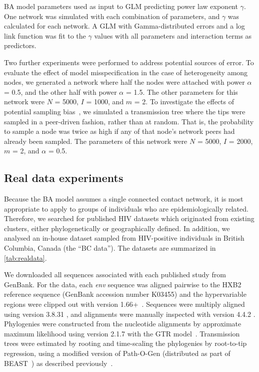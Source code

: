\begin{table}
  \centering
  
  \caption[\gls{BA} parameters used as input \gls{GLM} predicting $\gamma$]
  {
    \gls{BA} model parameters used as input to \gls{GLM} predicting power law
    exponent $\gamma$. One network was simulated with each combination of
    parameters, and $\gamma$ was calculated for each network. A \gls{GLM} with
    Gamma-distributed errors and a log link function was fit to the $\gamma$
    values with all parameters and interaction terms as predictors.
  }
  \label{tab:gammaexpt}
\end{table}

Two further experiments were performed to address potential sources of error.
To evaluate the effect of model misspecification in the case of heterogeneity
among nodes, we generated a network where half the nodes were attached with
power $\alpha$ = 0.5, and the other half with power $\alpha$ = 1.5. The other
parameters for this network were $N$ = 5000, $I$ = 1000, and $m$ = 2. To
investigate the effects of potential sampling
bias~\autocite{karcher2016quantifying}, we simulated a transmission tree where
the tips were sampled in a peer-driven fashion, rather than at random. That is,
the probability to sample a node was twice as high if any of that node's
network peers had already been sampled. The parameters of this network were $N$
= 5000, $I$ = 2000, $m$ = 2, and $\alpha$ = 0.5.

\subsection{Real data experiments}

Because the \gls{BA} model assumes a single connected contact network, it is
most appropriate to apply to groups of individuals who are epidemiologically
related. Therefore, we searched for published \gls{HIV} datasets which
originated from existing clusters, either phylogenetically or geographically
defined. In addition, we analysed an in-house dataset sampled from
\gls{HIV}-positive individuals in British Columbia, Canada (the ``BC data'').
The datasets are summarized in \cref{tab:realdata}.

We downloaded all sequences associated with each published study from GenBank.
For the \textcite{novitsky2014impact} data, each \textit{env} sequence was
aligned pairwise to the HXB2 reference sequence (GenBank accession number
K03455) and the hypervariable regions were clipped out with
 version 1.66+~\autocite{cock2009biopython}. Sequences were
multiply aligned using  version 3.8.31
\autocite{edgar2004muscle}, and alignments were manually inspected with
 version 4.4.2 \autocite{gouy2010seaview}. Phylogenies were
constructed from the nucleotide alignments by approximate maximum likelihood
using  version 2.1.7 \autocite{price2010fasttree} with the
\gls{GTR} model~\autocite{tavare1986some}. Transmission trees were estimated by
rooting and time-scaling the phylogenies by root-to-tip regression, using a
modified version of Path-O-Gen (distributed as part of
BEAST~\autocite{drummond2007beast}) as described
previously~\autocite{poon2015phylodynamic}. 

